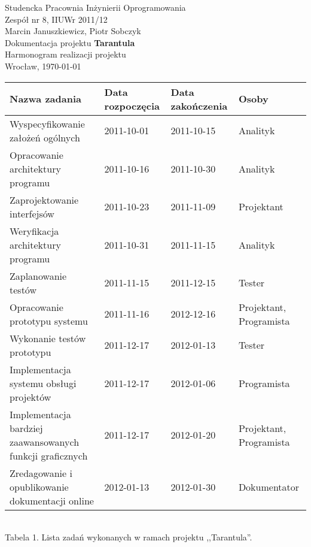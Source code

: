 \documentclass[11pt,leqno]{article}
\begin{document}
\begin{center}
\thispagestyle{empty}
{\Large Studencka Pracownia Inżynierii Oprogramowania}\\[0.5cm]
{\Large Zespół nr 8, IIUWr 2011/12}\\[2.5cm]

{\large Marcin Januszkiewicz, Piotr Sobczyk}\\[0.5cm]
{\huge Dokumentacja projektu \textbf{Tarantula}}\\[0.5cm]
{\huge Harmonogram realizacji projektu}\\[0.5cm]
\vfill
{\large Wrocław, \today}

\end{center}

\newpage
\newpage

\begin{landscape}

\begin{tabular}{|p{10cm}|l|l|l|}
\hline
Nazwa zadania & Data rozpoczęcia & Data zakończenia & Osoby \\ \hline
Wyspecyfikowanie założeń ogólnych & 2011-10-01 & 2011-10-15 & Analityk \\ \hline
Opracowanie architektury programu & 2011-10-16 & 2011-10-30 & Analityk \\ \hline
Zaprojektowanie interfejsów & 2011-10-23 & 2011-11-09 & Projektant \\ \hline
Weryfikacja architektury programu & 2011-10-31 & 2011-11-15 & Analityk \\ \hline
Zaplanowanie testów & 2011-11-15 & 2011-12-15 & Tester \\ \hline
Opracowanie prototypu systemu & 2011-11-16 & 2012-12-16 & Projektant, Programista \\ \hline
Wykonanie testów prototypu & 2011-12-17 & 2012-01-13 & Tester \\ \hline
Implementacja systemu obsługi projektów & 2011-12-17 & 2012-01-06 & Programista \\ \hline
Implementacja bardziej zaawansowanych funkcji graficznych & 2011-12-17 & 2012-01-20 & Projektant, Programista \\ \hline
Zredagowanie i opublikowanie dokumentacji online & 2012-01-13 & 2012-01-30 & Dokumentator \\ \hline
\end{tabular}
\\[0.5cm]
{\small Tabela 1. Lista zadań wykonanych w ramach projektu ,,Tarantula''.}
\end{landscape}
\end{document}
